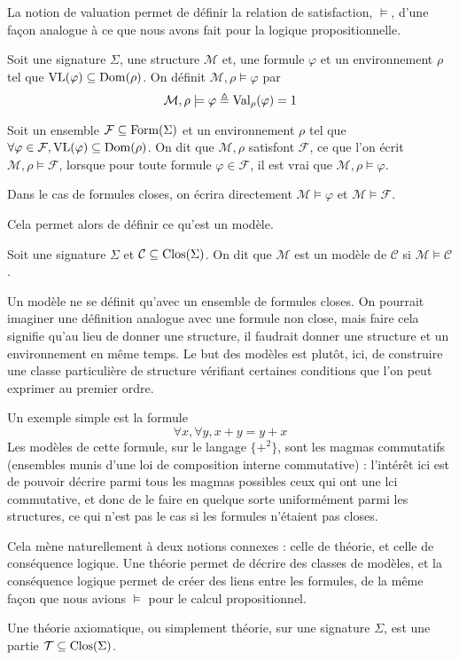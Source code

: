 La notion de valuation permet de définir la relation de satisfaction, $\models$,
d'une façon analogue à ce que nous avons fait pour la logique propositionnelle.

\begin{definition}[Satisfaction]
  Soit une signature $\Sigma$, une structure $\mathcal M$ et, une formule
  $\varphi$ et un environnement $\rho$ tel que $\operatorname{VL}(\varphi)\subseteq\operatorname{Dom}(\rho)$.
  On définit $\mathcal M,\rho\models \varphi$ par
  \[\mathcal M,\rho\models \varphi \triangleq \operatorname{Val}_\rho(\varphi) = 1\]

  Soit un ensemble $\mathcal F\subseteq\operatorname{Form}(\Sigma)$ et un environnement
  $\rho$ tel que $\forall \varphi\in\mathcal F, \operatorname{VL}(\varphi)\subseteq\operatorname{Dom}(\rho)$.
  On dit que $\mathcal M,\rho$ satisfont $\mathcal F$, ce que l'on écrit
  $\mathcal M,\rho\models\mathcal F$, lorsque pour toute formule
  $\varphi\in\mathcal F$, il est vrai que $\mathcal M,\rho\models \varphi$.

  Dans le cas de formules closes, on écrira directement
  $\mathcal M\models\varphi$ et $\mathcal M\models \mathcal F$.
\end{definition}

Cela permet alors de définir ce qu'est un modèle.

\begin{definition}[Modèle]
  Soit une signature $\Sigma$ et $\mathcal C\subseteq\operatorname{Clos}(\Sigma)$. On dit que
  $\mathcal M$ est un modèle de $\mathcal C$ si $\mathcal M\models \mathcal C$.
\end{definition}

Un modèle ne se définit qu'avec un ensemble de formules closes. On pourrait
imaginer une définition analogue avec une formule non close, mais faire cela
signifie qu'au lieu de donner une structure, il faudrait donner une structure et
un environnement en même temps. Le but des modèles est plutôt, ici, de construire
une classe particulière de structure vérifiant certaines conditions que l'on peut
exprimer au premier ordre.

Un exemple simple est la formule
\[\forall x,\forall y, x + y = y + x\]
Les modèles de cette formule, sur le langage $\{+^2\}$, sont les magmas
commutatifs (ensembles munis d'une loi de composition interne commutative) :
l'intérêt ici est de pouvoir décrire parmi tous les magmas possibles ceux qui
ont une lci commutative, et donc de le faire en quelque sorte uniformément parmi
les structures, ce qui n'est pas le cas si les formules n'étaient pas closes.

Cela mène naturellement à deux notions connexes : celle de théorie, et celle
de conséquence logique. Une théorie permet de décrire des classes de modèles, et
la conséquence logique permet de créer des liens entre les formules, de la même
façon que nous avions $\vDash$ pour le calcul propositionnel.

\begin{definition}[Théorie]
  Une théorie axiomatique, ou simplement théorie, sur une signature $\Sigma$, est
  une partie $\mathcal T\subseteq\operatorname{Clos}(\Sigma)$.
\end{definition}
